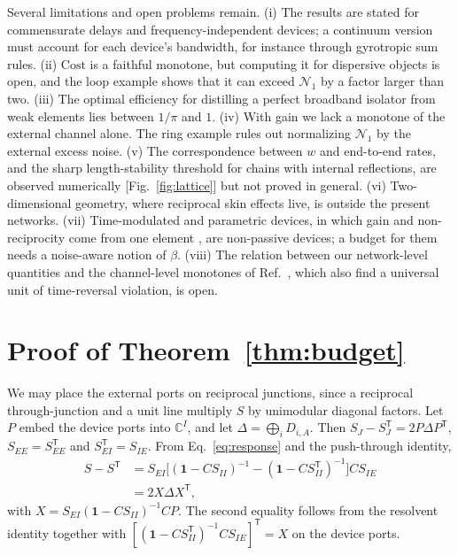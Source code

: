 \documentclass[aps,pra,twocolumn,superscriptaddress,floatfix,nofootinbib]{revtex4-2}
\theoremstyle{definition}
\newcommand{\NN}{\mathcal N_1}
\newcommand{\one}{\mathbf 1}
\newcommand{\T}{\mathsf T}
\newcommand{\Cost}{\mathrm{Cost}}
\begin{document}
Several limitations and open problems remain. (i) The results are stated for commensurate delays and frequency-independent devices; a continuum version must account for each device's bandwidth, for instance through gyrotropic sum rules. (ii) $\Cost$ is a faithful monotone, but computing it for dispersive objects is open, and the loop example shows that it can exceed $\NN$ by a factor larger than two. (iii) The optimal efficiency for distilling a perfect broadband isolator from weak elements lies between $1/\pi$ and $1$. (iv) With gain we lack a monotone of the external channel alone. The ring example rules out normalizing $\NN$ by the external excess noise. (v) The correspondence between $w$ and end-to-end rates, and the sharp length-stability threshold for chains with internal reflections, are observed numerically [Fig.~\ref{fig:lattice}] but not proved in general. (vi) Two-dimensional geometry, where reciprocal skin effects live, is outside the present networks. (vii) Time-modulated and parametric devices, in which gain and non-reciprocity come from one element \cite{Kam11,MC15,Mal18}, are non-passive devices; a budget for them needs a noise-aware notion of $\beta$. (viii) The relation between our network-level quantities and the channel-level monotones of Ref.~\cite{MKM26}, which also find a universal unit of time-reversal violation, is open.

\appendix

\section{Proof of Theorem~\ref{thm:budget}}\label{app:budget}

We may place the external ports on reciprocal junctions, since a reciprocal through-junction and a unit line multiply $S$ by unimodular diagonal factors. Let $P$ embed the device ports into $\mathbb C^I$, and let $\Delta=\bigoplus_iD_{i,A}$. Then $S_J-S_J^\T=2P\Delta P^\T$, $S_{EE}=S_{EE}^\T$ and $S_{EI}^\T=S_{IE}$. From Eq.~\eqref{eq:response} and the push-through identity,
\begin{align*}
S-S^\T&=S_{EI}\bigl[(\one-CS_{II})^{-1}-(\one-CS_{II}^\T)^{-1}\bigr]CS_{IE}\\
&=2X\Delta X^\T,
\end{align*}
with $X=S_{EI}(\one-CS_{II})^{-1}CP$. The second equality follows from the resolvent identity together with $[(\one-CS_{II}^\T)^{-1}CS_{IE}]^\T=X$ on the device ports.
\end{document}
